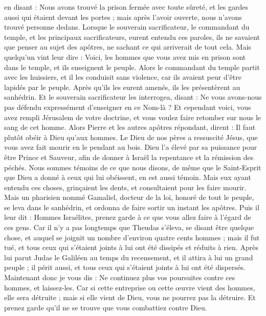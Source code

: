 \begin{multicols}{2}
en disant : Nous avons trouvé la prison fermée avec toute sûreté, et les gardes aussi qui étaient devant les portes ; mais après l'avoir ouverte, nous n'avons trouvé personne dedans.
Lorsque le souverain sacrificateur, le commandant du temple, et les principaux sacrificateurs, eurent entendu ces paroles, ils ne savaient que penser au sujet des apôtres, ne sachant ce qui arriverait de tout cela.
Mais quelqu'un vint leur dire : Voici, les hommes que vous avez mis en prison sont dans le temple, et ils enseignent le peuple.
Alors le commandant du temple partit avec les huissiers, et il les conduisit sans violence, car ils avaient peur d'être lapidés par le peuple.
Après qu'ils les eurent amenés, ils les présentèrent au sanhédrin. Et le souverain sacrificateur les interrogea,
disant : Ne vous avons-nous pas défendu expressément d'enseigner en ce Nom-là ? Et cependant voici, vous avez rempli Jérusalem de votre doctrine, et vous voulez faire retomber sur nous le sang de cet homme.
Alors Pierre et les autres apôtres répondant, dirent : Il faut plutôt obéir à Dieu qu'aux hommes.
Le Dieu de nos pères a ressuscité Jésus, que vous avez fait mourir en le pendant au bois.
Dieu l'a élevé par sa puissance pour être Prince et Sauveur, afin de donner à Israël la repentance et la rémission des péchés.
Nous sommes témoins de ce que nous disons, de même que le Saint-Esprit que Dieu a donné à ceux qui lui obéissent, en est aussi témoin.
Mais eux ayant entendu ces choses, grinçaient les dents, et consultaient pour les faire mourir.
Mais un pharisien nommé Gamaliel, docteur de la loi, honoré de tout le peuple, se leva dans le sanhédrin, et ordonna de faire sortir un instant les apôtres.
Puis il leur dit : Hommes Israélites, prenez garde à ce que vous allez faire à l'égard de ces gens.
Car il n'y a pas longtemps que Theudas s'éleva, se disant être quelque chose, et auquel se joignit un nombre d'environ quatre cents hommes ; mais il fut tué, et tous ceux qui s'étaient joints à lui ont été dissipés et réduits à rien.
Après lui parut Judas le Galiléen au temps du recensement, et il attira à lui un grand peuple ; il périt aussi, et tous ceux qui s'étaient joints à lui ont été dispersés.
Maintenant donc je vous dis : Ne continuez plus vos poursuites contre ces hommes, et laissez-les. Car si cette entreprise ou cette œuvre vient des hommes, elle sera détruite ;
mais si elle vient de Dieu, vous ne pourrez pas la détruire. Et prenez garde qu'il ne se trouve que vous combattiez contre Dieu.

\end{multicols}
